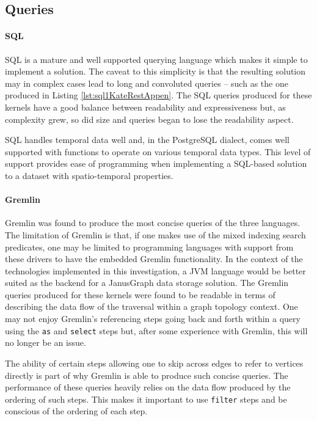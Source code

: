 \subsection{Queries}

\paragraph{SQL}

SQL is a mature and well supported querying language which makes it simple to implement a solution. The caveat to this simplicity is that the resulting solution may in complex cases lead to long and convoluted queries -- such as the one produced in Listing \ref{lst:sql1KateRestAppen}. The SQL queries produced for these kernels have a good balance between readability and expressiveness but, as complexity grew, so did size and queries began to lose the readability aspect.

SQL handles temporal data well and, in the PostgreSQL dialect, comes well supported with functions to operate on various temporal data types. This level of support provides ease of programming when implementing a SQL-based solution to a dataset with spatio-temporal properties.

\paragraph{Gremlin} 

Gremlin was found to produce the most concise queries of the three languages. The limitation of Gremlin is that, if one makes use of the mixed indexing search predicates, one may be limited to programming languages with support from these drivers to have the embedded Gremlin functionality. In the context of the technologies implemented in this investigation, a JVM language would be better suited as the backend for a JanusGraph data storage solution. The Gremlin queries produced for these kernels were found to be readable in terms of describing the data flow of the traversal within a graph topology context. One may not enjoy Gremlin's referencing steps going back and forth within a query using the \texttt{as} and \texttt{select} steps but, after some experience with Gremlin, this will no longer be an issue.

The ability of certain steps allowing one to skip across edges to refer to vertices directly is part of why Gremlin is able to produce such concise queries. The performance of these queries heavily relies on the data flow produced by the ordering of such steps. This makes it important to use \texttt{filter} steps and be conscious of the ordering of each step.

